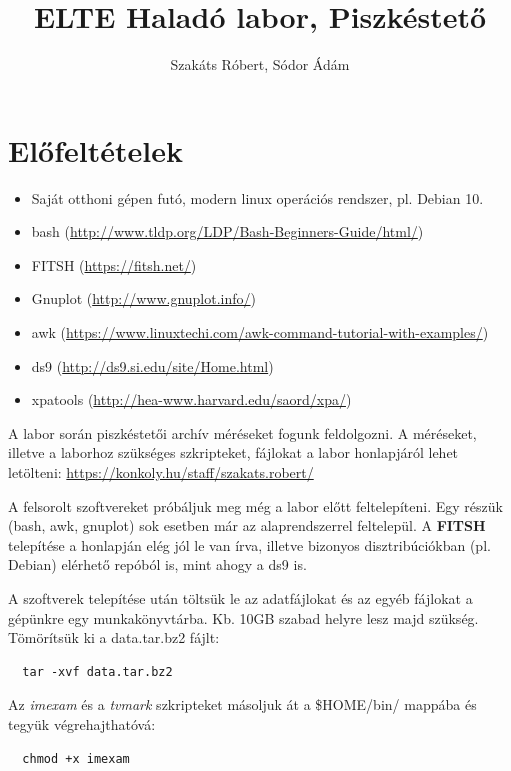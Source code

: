 \documentclass{article}
\begin{document}
\title{ELTE Haladó labor, Piszkéstető}
\author{Szakáts Róbert, Sódor Ádám}

\maketitle
\tableofcontents
\newpage

\section{Előfeltételek}
\begin{itemize}
  \item Saját otthoni gépen futó, modern linux operációs rendszer, pl. Debian 10.
  \item bash (\url{http://www.tldp.org/LDP/Bash-Beginners-Guide/html/})
  \item FITSH (\url{https://fitsh.net/})
  \item Gnuplot (\url{http://www.gnuplot.info/})
  \item awk (\url{https://www.linuxtechi.com/awk-command-tutorial-with-examples/})
  \item ds9 (\url{http://ds9.si.edu/site/Home.html})
  \item xpatools (\url{http://hea-www.harvard.edu/saord/xpa/})
\end{itemize}

A labor során piszkéstetői archív méréseket fogunk feldolgozni. A méréseket,
illetve a laborhoz szükséges szkripteket, fájlokat a labor honlapjáról lehet
letölteni:
\url{https://konkoly.hu/staff/szakats.robert/}

A felsorolt szoftvereket próbáljuk meg még a labor előtt feltelepíteni.
Egy részük (bash, awk, gnuplot) sok esetben már az alaprendszerrel feltelepül.
A {\bf{FITSH}} telepítése a honlapján elég jól le van írva, illetve bizonyos
disztribúciókban (pl. Debian) elérhető repóból is, mint ahogy a ds9 is.

A szoftverek telepítése után töltsük le az adatfájlokat és az egyéb fájlokat a
gépünkre egy munkakönyvtárba. Kb. 10GB szabad helyre lesz majd szükség.
Tömörítsük ki a data.tar.bz2 fájlt:
\begin{verbatim}
  tar -xvf data.tar.bz2
\end{verbatim}


Az {\it imexam} és a {\it tvmark} szkripteket másoljuk át a \$HOME/bin/ mappába
és tegyük végrehajthatóvá:
\begin{verbatim}
  chmod +x imexam
\end{verbatim}
\end{document}
